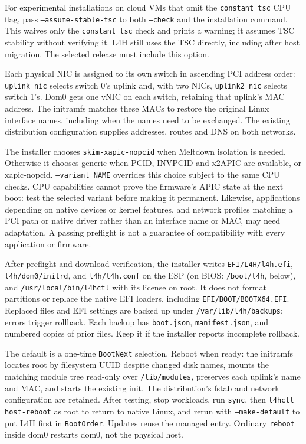 \documentclass[11pt,a4paper]{report}
\newcommand{\cmd}[1]{\texttt{#1}}
\newcommand{\file}[1]{\texttt{#1}}
\begin{document}
For experimental installations on cloud VMs that omit the
\texttt{constant\_tsc} CPU flag, pass \texttt{--assume-stable-tsc} to both
\texttt{--check} and the installation command. This waives only the
\texttt{constant\_tsc} check and prints a warning; it assumes TSC stability
without verifying it. L4H still uses the TSC directly, including after
host migration. The selected release must include this option.

Each physical NIC is assigned to its own switch in ascending PCI address
order: \texttt{uplink\_nic} selects switch 0's uplink and, with two NICs,
\texttt{uplink2\_nic} selects switch 1's. Dom0 gets one vNIC on each
switch, retaining that uplink's MAC address. The initramfs matches these
MACs to restore the original Linux interface names, including when the
names need to be exchanged. The existing distribution configuration
supplies addresses, routes and DNS on both networks.

The installer chooses \texttt{skim-xapic-nopcid} when Meltdown isolation
is needed. Otherwise it chooses generic when PCID, INVPCID and x2APIC
are available, or xapic-nopcid. \texttt{--variant NAME} overrides this
choice subject to the same CPU checks. CPU capabilities cannot prove the
firmware's APIC state at the next boot: test the selected variant before making it permanent.
Likewise, applications depending on native devices or kernel features,
and network profiles matching a PCI path or native driver rather than
an interface name or MAC, may need adaptation. A passing preflight is
not a guarantee of compatibility with every application or firmware.

After preflight and download verification, the installer writes
\file{EFI/L4H/l4h.efi}, \file{l4h/dom0/initrd}, and \file{l4h/l4h.conf} on
the ESP (on BIOS: \file{/boot/l4h}, below), and \file{/usr/local/bin/l4hctl} with its license on root. It
does not format partitions or replace the native EFI loaders, including
\file{EFI/BOOT/BOOTX64.EFI}. Replaced files and EFI settings are backed
up under \file{/var/lib/l4h/backups}; errors trigger rollback. Each backup
has \file{boot.json}, \file{manifest.json}, and numbered copies of prior
files. Keep it if the installer reports incomplete rollback.

The default is a one-time \texttt{BootNext} selection. Reboot when ready:
the initramfs locates root by filesystem UUID despite changed disk names,
mounts the matching module tree read-only over \file{/lib/modules},
preserves each uplink's name and MAC, and starts the existing init.
The distribution's fstab and network configuration are retained. After
testing, stop workloads, run \cmd{sync}, then \cmd{l4hctl host-reboot}
as root to return to native Linux, and rerun with \texttt{--make-default}
to put L4H first in \texttt{BootOrder}. Updates reuse the managed entry.
Ordinary \cmd{reboot} inside dom0 restarts dom0, not the physical host.
\end{document}
